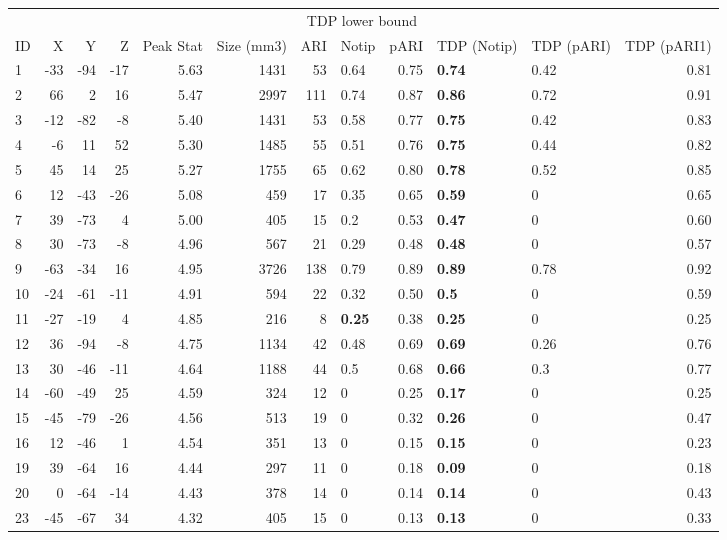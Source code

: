 
\begin{tabular}{lrrrrrrlrllr}
\toprule
\multicolumn{6}{c}{ } & \multicolumn{3}{c}{TDP lower bound} \\
\cmidrule(l{3pt}r{3pt}){7-9}
ID & X & Y & Z & Peak Stat & Size (mm3) & ARI & Notip & pARI & TDP (Notip) & TDP (pARI) & TDP (pARI1)\\
\midrule
1 & -33 & -94 & -17 & 5.63 & 1431 & 53 & 0.64 & 0.75 & \textbf{0.74} & 0.42 & 0.81\\
2 & 66 & 2 & 16 & 5.47 & 2997 & 111 & 0.74 & 0.87 & \textbf{0.86} & 0.72 & 0.91\\
3 & -12 & -82 & -8 & 5.40 & 1431 & 53 & 0.58 & 0.77 & \textbf{0.75} & 0.42 & 0.83\\
4 & -6 & 11 & 52 & 5.30 & 1485 & 55 & 0.51 & 0.76 & \textbf{0.75} & 0.44 & 0.82\\
5 & 45 & 14 & 25 & 5.27 & 1755 & 65 & 0.62 & 0.80 & \textbf{0.78} & 0.52 & 0.85\\
6 & 12 & -43 & -26 & 5.08 & 459 & 17 & 0.35 & 0.65 & \textbf{0.59} & 0 & 0.65\\
7 & 39 & -73 & 4 & 5.00 & 405 & 15 & 0.2 & 0.53 & \textbf{0.47} & 0 & 0.60\\
8 & 30 & -73 & -8 & 4.96 & 567 & 21 & 0.29 & 0.48 & \textbf{0.48} & 0 & 0.57\\
9 & -63 & -34 & 16 & 4.95 & 3726 & 138 & 0.79 & 0.89 & \textbf{0.89} & 0.78 & 0.92\\
10 & -24 & -61 & -11 & 4.91 & 594 & 22 & 0.32 & 0.50 & \textbf{0.5} & 0 & 0.59\\
11 & -27 & -19 & 4 & 4.85 & 216 & 8 & \textbf{0.25} & 0.38 & \textbf{0.25} & 0 & 0.25\\
12 & 36 & -94 & -8 & 4.75 & 1134 & 42 & 0.48 & 0.69 & \textbf{0.69} & 0.26 & 0.76\\
13 & 30 & -46 & -11 & 4.64 & 1188 & 44 & 0.5 & 0.68 & \textbf{0.66} & 0.3 & 0.77\\
14 & -60 & -49 & 25 & 4.59 & 324 & 12 & 0 & 0.25 & \textbf{0.17} & 0 & 0.25\\
15 & -45 & -79 & -26 & 4.56 & 513 & 19 & 0 & 0.32 & \textbf{0.26} & 0 & 0.47\\
16 & 12 & -46 & 1 & 4.54 & 351 & 13 & 0 & 0.15 & \textbf{0.15} & 0 & 0.23\\
19 & 39 & -64 & 16 & 4.44 & 297 & 11 & 0 & 0.18 & \textbf{0.09} & 0 & 0.18\\
20 & 0 & -64 & -14 & 4.43 & 378 & 14 & 0 & 0.14 & \textbf{0.14} & 0 & 0.43\\
23 & -45 & -67 & 34 & 4.32 & 405 & 15 & 0 & 0.13 & \textbf{0.13} & 0 & 0.33\\
\bottomrule
\end{tabular}
